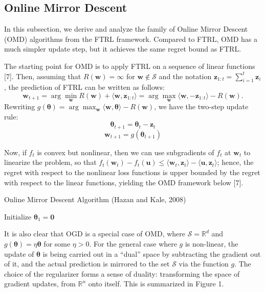 \documentclass{article}
\begin{document}
\subsection{Online Mirror Descent}

In this subsection, we derive and analyze the family of Online Mirror Descent (OMD) algorithms from the FTRL framework. Compared to FTRL, OMD has a much simpler update step, but it achieves the same regret bound as FTRL.

The starting point for OMD is to apply FTRL on a sequence of linear functions [7]. Then, assuming that $R(\textbf{w})=\infty$ for $\textbf{w}\notin \mathcal{S}$ and the notation $\textbf{z}_{1:t}=\sum_{i=1}^t \textbf{z}_i$, the prediction of FTRL can be written as follows: \[\textbf{w}_{t+1}=\arg\min_{\textbf{w}}R(\textbf{w})+\langle \textbf{w}, \textbf{z}_{1:t}\rangle=\arg\max_{\textbf{w}} \langle \textbf{w}, -\textbf{z}_{1:t}\rangle-R(\textbf{w}).\]
Rewriting $g(\bm{\theta})=\arg\max_{\textbf{w}} \langle \textbf{w},\bm{\theta}\rangle-R(\textbf{w})$, we have the two-step update rule:  $$\bm{\theta}_{t+1}=\bm{\theta}_t-\textbf{z}_t$$ $$\textbf{w}_{t+1}=g(\bm{\theta}_{t+1})$$

Now, if $f_t$ is convex but nonlinear, then we can use subgradients of $f_t$ at $\textbf{w}_t$ to linearize the problem, so that $f_t(\textbf{w}_t)-f_t(\textbf{u})\leq \langle \textbf{w}_t, \textbf{z}_t\rangle-\langle \textbf{u}, \textbf{z}_t\rangle$; hence, the regret with respect to the nonlinear loss functions is upper bounded by the regret with respect to the linear functions, yielding the OMD framework below [7].

\begin{algorithm}[H]
  \caption{Online Mirror Descent Algorithm (Hazan and Kale, 2008)}
  Initialize $\bm{\theta}_1=\textbf{0}$

\end{algorithm}

It is also clear that OGD is a special case of OMD, where $\mathcal{S}=\mathbb{R}^d$ and $g(\bm{\theta})=\eta\bm{\theta}$ for some $\eta>0$. For the general case where $g$ is non-linear, the update of $\bm{\theta}$ is being carried out in a ``dual'' space by subtracting the gradient out of it, and the actual prediction is mirrored to the set $\mathcal{S}$ via the function $g$. The choice of the regularizer forms a sense of duality: transforming the space of gradient updates, from $\mathbb{R}^n$ onto itself. This is summarized in Figure 1.
\end{document}
